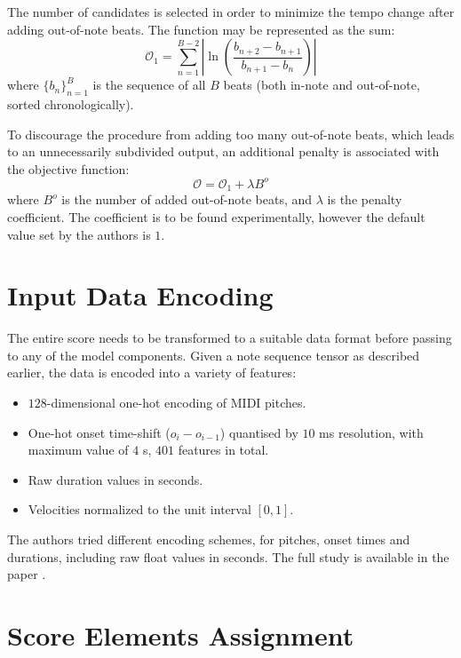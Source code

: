 The number of candidates is selected in order to minimize the tempo change after adding out-of-note beats. The function may be represented as the sum: \[\mathcal{O}_1 = \sum_{n=1}^{B-2}\left|\ln\left(\frac{b_{n+2} - b_{n+1}}{b_{n+1} - b_n}\right)\right|\] where $\{b_n\}_{n=1}^B$ is the sequence of all $B$ beats (both in-note and out-of-note, sorted chronologically).

To discourage the procedure from adding too many out-of-note beats, which leads to an unnecessarily subdivided output, an additional penalty is associated with the objective function: \begin{equation}\label{out_of_note_objective}
\mathcal{O} = \mathcal{O}_1 + \lambda B^o
\end{equation} where $B^o$ is the number of added out-of-note beats, and $\lambda$ is the penalty coefficient. The coefficient is to be found experimentally, however the default value set by the authors is $1$.



\section{Input Data Encoding}

The entire score needs to be transformed to a suitable data format before passing to any of the model components. Given a note sequence tensor as described earlier, the data is encoded into a variety of features: \begin{itemize}
	\item $128$-dimensional one-hot encoding of MIDI pitches.
	\item One-hot onset time-shift ($o_i - o_{i-1}$) quantised by $10$ ms resolution, with maximum value of $4$ s, $401$ features in total.
	\item Raw duration values in seconds.
	\item Velocities normalized to the unit interval $[0, 1]$.
\end{itemize}

The authors tried different encoding schemes, for pitches, onset times and durations, including raw float values in seconds. The full study is available in the paper \cite{Liu2022}.

\section{Score Elements Assignment}

